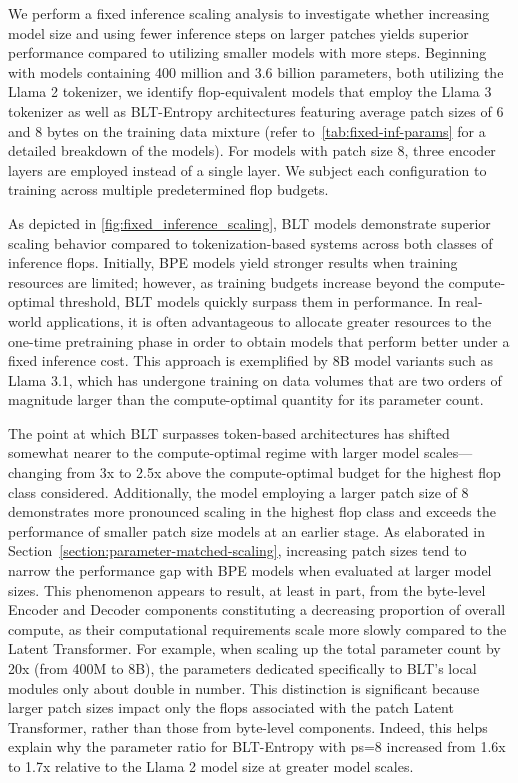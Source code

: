 We perform a fixed inference scaling analysis to investigate whether increasing model size and using fewer inference steps on larger patches yields superior performance compared to utilizing smaller models with more steps. Beginning with models containing 400 million and 3.6 billion parameters, both utilizing the Llama 2 tokenizer, we identify flop-equivalent models that employ the Llama 3 tokenizer as well as {\textsc BLT}-Entropy architectures featuring average patch sizes of 6 and 8 bytes on the training data mixture (refer to~\autoref{tab:fixed-inf-params} for a detailed breakdown of the models). For models with patch size 8, three encoder layers are employed instead of a single layer. We subject each configuration to training across multiple predetermined flop budgets.

As depicted in \autoref{fig:fixed_inference_scaling}, {\textsc BLT} models demonstrate superior scaling behavior compared to tokenization-based systems across both classes of inference flops. Initially, BPE models yield stronger results when training resources are limited; however, as training budgets increase beyond the compute-optimal threshold, {\textsc BLT} models quickly surpass them in performance. In real-world applications, it is often advantageous to allocate greater resources to the one-time pretraining phase in order to obtain models that perform better under a fixed inference cost. This approach is exemplified by 8B model variants such as Llama 3.1, which has undergone training on data volumes that are two orders of magnitude larger than the compute-optimal quantity for its parameter count.

The point at which {\textsc BLT} surpasses token-based architectures has shifted somewhat nearer to the compute-optimal regime with larger model scales—changing from 3x to 2.5x above the compute-optimal budget for the highest flop class considered. Additionally, the model employing a larger patch size of 8 demonstrates more pronounced scaling in the highest flop class and exceeds the performance of smaller patch size models at an earlier stage. As elaborated in Section~\ref{section:parameter-matched-scaling}, increasing patch sizes tend to narrow the performance gap with BPE models when evaluated at larger model sizes. This phenomenon appears to result, at least in part, from the byte-level Encoder and Decoder components constituting a decreasing proportion of overall compute, as their computational requirements scale more slowly compared to the Latent Transformer. For example, when scaling up the total parameter count by 20x (from 400M to 8B), the parameters dedicated specifically to {\textsc BLT}'s local modules only about double in number. This distinction is significant because larger patch sizes impact only the flops associated with the patch Latent Transformer, rather than those from byte-level components. Indeed, this helps explain why the parameter ratio for {\textsc BLT}-Entropy with ps=8 increased from 1.6x to 1.7x relative to the Llama 2 model size at greater model scales.

